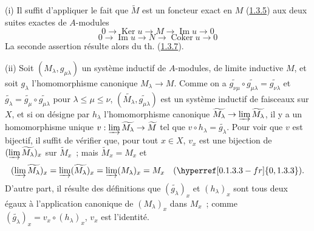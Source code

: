 (i) Il suffit d'appliquer le fait que $\widetilde{M}$ est un foncteur exact en
$M$ (\hyperref[I.1.3.5-fr]{1.3.5}) aux deux suites exactes de $A$-modules
\[
  0\to\operatorname{Ker}u\to M\to\operatorname{Im}u\to0
\]
\[
  0\to\operatorname{Im}u\to N\to\operatorname{Coker}u\to0
\]
La seconde assertion résulte alors du th.
(\hyperref[I.1.3.7-fr]{1.3.7}).

(ii) Soit $(M_\lambda,g_{\mu\lambda})$ un système inductif de $A$-modules, de
limite inductive $M$, et soit $g_\lambda$ l'homomorphisme canonique
$M_\lambda\to M$. Comme on a
$\widetilde{g_{\nu\mu}}\circ\widetilde{g_{\mu\lambda}}
=\widetilde{g_{\nu\lambda}}$ et
$\widetilde{g_\lambda}=\widetilde{g_\mu}\circ
\widetilde{g_{\mu\lambda}}$ pour $\lambda\leq\mu\leq\nu$,
$(\widetilde{M_\lambda},\widetilde{g_{\mu\lambda}})$ est un système
inductif de faisceaux sur $X$, et si on désigne par $h_\lambda$
l'homomorphisme canonique
$\widetilde{M_\lambda}\to\varinjlim\widetilde{M_\lambda}$, il y a un
homomorphisme unique
$v:\varinjlim\widetilde{M_\lambda}\to\widetilde{M}$ tel que
$v\circ h_\lambda=\widetilde{g_\lambda}$. Pour voir que $v$ est bijectif, il
suffit de vérifier que, pour tout $x\in X$, $v_x$ est une bijection de
$(\varinjlim\widetilde{M_\lambda})_x$ sur $\widetilde{M}_x$~; mais
$\widetilde{M}_x=M_x$ et
\[
  (\varinjlim\widetilde{M_\lambda})_x
  =\varinjlim(\widetilde{M_\lambda})_x
  =\varinjlim(M_\lambda)_x=M_x
  \quad(\hyperref[0.1.3.3-fr]{0, 1.3.3}).
\]
D'autre part, il résulte des définitions que $(\widetilde{g_\lambda})_x$ et
$(h_\lambda)_x$ sont tous deux égaux à l'application canonique de
$(M_\lambda)_x$ dans $M_x$~; comme
$(\widetilde{g_\lambda})_x=v_x\circ(h_\lambda)_x$, $v_x$ est l'identité.
